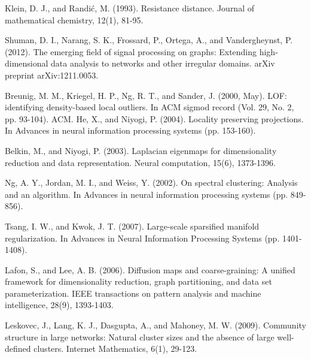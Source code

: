 \documentclass[preprint, review, 12pt]{article}
\theoremstyle{definition}
\theoremstyle{remark}
\begin{document}
\begin{thebibliography}{}



Klein, D. J., and Randić, M. (1993). Resistance distance. Journal of mathematical chemistry, 12(1), 81-95.

 Shuman, D. I., Narang, S. K., Frossard, P., Ortega, A., and Vandergheynst, P. (2012). The emerging field of signal processing on graphs: Extending high-dimensional data analysis to networks and other irregular domains. arXiv preprint arXiv:1211.0053.

 Breunig, M. M., Kriegel, H. P., Ng, R. T., and Sander, J. (2000, May). LOF: identifying density-based local outliers. In ACM sigmod record (Vol. 29, No. 2, pp. 93-104). ACM.
 He, X., and Niyogi, P. (2004). Locality preserving projections. In Advances in neural information processing systems (pp. 153-160).

 Belkin, M., and Niyogi, P. (2003). Laplacian eigenmaps for dimensionality reduction and data representation. Neural computation, 15(6), 1373-1396.

 Ng, A. Y., Jordan, M. I., and Weiss, Y. (2002). On spectral clustering: Analysis and an algorithm. In Advances in neural information processing systems (pp. 849-856).

 Tsang, I. W., and Kwok, J. T. (2007). Large-scale sparsified manifold regularization. In Advances in Neural Information Processing Systems (pp. 1401-1408).


 Lafon, S., and Lee, A. B. (2006). Diffusion maps and coarse-graining: A unified framework for dimensionality reduction, graph partitioning, and data set parameterization. IEEE transactions on pattern analysis and machine intelligence, 28(9), 1393-1403.

 Leskovec, J., Lang, K. J., Dasgupta, A., and Mahoney, M. W. (2009). Community structure in large networks: Natural cluster sizes and the absence of large well-defined clusters. Internet Mathematics, 6(1), 29-123.

\end{thebibliography}
\end{document}
